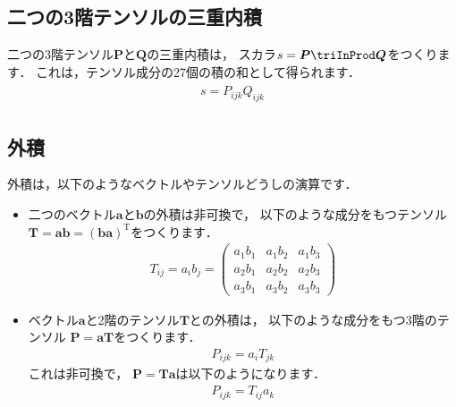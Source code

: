 \subsection{二つの3階テンソルの三重内積}
\label{ssec:1.3.3}
二つの3階テンソル$\bm{P}$と$\bm{Q}$の三重内積は，
スカラ$s = \bm{P} \triInProd \bm{Q}$をつくります．
これは，テンソル成分の27個の積の和として得られます．
\begin{align}
 \label{eq:1.18}
 \begin{aligned}
  s = P_{ijk}Q_{ijk}
 \end{aligned}
\end{align}


\subsection{外積}
\label{ssec:1.3.4}
外積は，以下のようなベクトルやテンソルどうしの演算です．
\begin{itemize}
 \item 二つのベクトル$\bm{a}$と$\bm{b}$の外積は非可換で，
       以下のような成分をもつテンソル
       $\bm{T} = \bm{a}\bm{b} = (\bm{b}\bm{a})^{\mathrm{T}}$をつくります．
       \begin{align}
        \label{eq:1.19}
        T_{ij} = a_{i}b_{j} =
        \begin{pmatrix}
         a_{1}b_{1} & a_{1}b_{2} & a_{1}b_{3} \\
         a_{2}b_{1} & a_{2}b_{2} & a_{2}b_{3} \\
         a_{3}b_{1} & a_{3}b_{2} & a_{3}b_{3}
        \end{pmatrix}
       \end{align}
 \item ベクトル$\bm{a}$と2階のテンソル$\bm{T}$との外積は，
       以下のような成分をもつ3階のテンソル
       $\bm{P} = \bm{a}\bm{T}$をつくります．
       \begin{align}
        \label{eq:1.20}
        P_{ijk} = a_{i}T_{jk}
       \end{align}
       これは非可換で，
       $\bm{P} = \bm{T}\bm{a}$は以下のようになります．
       \begin{align}
        \label{eq:1.21}
        P_{ijk} = T_{ij}a_{k}
       \end{align}
\end{itemize}


